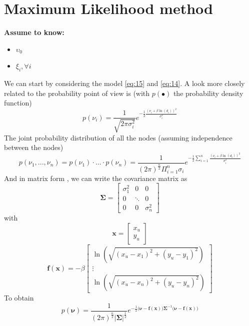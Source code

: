 \documentclass[12pt]{report}
\begin{document}
\section{Maximum Likelihood method}
  \begin{center}
  \textbf{Assume to know:}
  \begin{itemize}
    \centering
    \item $\upsilon_0$
    \item $\xi_i,\forall i$
  \end{itemize}
  \end{center}
We can start by considering the model \ref{eq:15} and \ref{eq:14}.
A look more closely related to the probability point of view is (with $p(\bullet)$ the probability density function)
\begin{equation}
    p(\nu_i)=\frac{1}{\sqrt{2\pi\sigma^2_i}}e^{-\frac{1}{2}\frac{(\nu_i+\beta\ln(d_i))^2}{\sigma^2_i}}
\end{equation}
The joint probability distribution of all the nodes (assuming independence between the nodes) \begin{equation}
    p(\nu_1,...,\nu_n)=p(\nu_1)\cdot...\cdot p(\nu_n)=\frac{1}{(2\pi)^{\frac{n}{2}}\Pi_{i=1}^n\sigma_i}e^{-\frac{1}{2}\sum_{i=1}^n\frac{(\nu_i+\beta\ln(d_i))^2}{\sigma^2_i}}
\end{equation}
And in matrix form \cite{rzk}, we can write the covariance matrix as 
\begin{equation}
    \boldsymbol{\Sigma}=\begin{bmatrix}
    \sigma^2_1 & 0 & 0\\
    0 &\ddots& 0\\
    0&0&\sigma^2_n
    \end{bmatrix}
\end{equation}
with
\begin{equation}
    \mathbf{x}=\begin{bmatrix}
    x_u\\
    y_u
    \end{bmatrix}
\end{equation}
\begin{equation}
    \mathbf{f}(\mathbf{x})=-\beta\begin{bmatrix}
\ln(\sqrt{(x_u-x_1)^2+(y_u-y_1)^2})\\
\vdots\\
\ln(\sqrt{(x_u-x_n)^2+(y_u-y_n)^2})
\end{bmatrix}
\end{equation}
To obtain
\begin{equation}
    p(\boldsymbol{\nu})=\frac{1}{(2\pi)^{\frac{n}{2}}|\boldsymbol{\Sigma}|^{\frac{1}{2}}}e^{-\frac{1}{2}\big(\boldsymbol{\nu}-\mathbf{f}(\mathbf{x})\big)\boldsymbol{\Sigma}^{-1}\big(\boldsymbol{\nu}-\mathbf{f}(\mathbf{x})\big)}
    \label{eq:16}
\end{equation}
\end{document}
